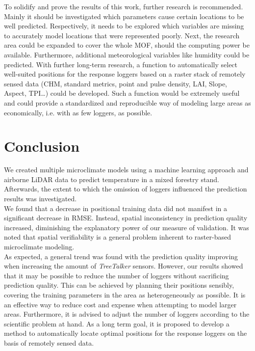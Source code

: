 \documentclass[5p]{elsarticle} %
\begin{document}
To solidify and prove the results of this work, further research is recommended. Mainly it should be investigated which parameters cause certain locations to be well predicted. Respectively, it needs to be explored which variables are missing to accurately model locations that were represented poorly. Next, the research area could be expanded to cover the whole MOF, should the computing power be available. Furthermore, additional meteorological variables like humidity could be predicted. With further long-term research, a function to automatically select well-suited positions for the response loggers based on a raster stack of remotely sensed data (CHM, standard metrics, point and pulse density, LAI, Slope, Aspect, TPI…) could be developed. Such a function would be extremely useful and could provide a standardized and reproducible way of modeling large areas as economically, i.e. with as few loggers, as possible.



\hypertarget{conclusion}{%
\section{Conclusion}\label{conclusion}}

We created multiple microclimate models using a machine learning approach and airborne LiDAR data to predict temperature in a mixed forestry stand. Afterwards, the extent to which the omission of loggers influenced the prediction results was investigated.\\
We found that a decrease in positional training data did not manifest in a significant decrease in RMSE. Instead, spatial inconsistency in prediction quality increased, diminishing the explanatory power of our measure of validation. It was noted that spatial verifiability is a general problem inherent to raster-based microclimate modeling.\\ 
As expected, a general trend was found with the prediction quality improving when increasing the amount of \emph{TreeTalker} sensors. However, our results showed that it may be possible to reduce the number of loggers without sacrificing prediction quality. This can be achieved by planning their positions sensibly, covering the training parameters in the area as heterogeneously as possible. It is an effective way to reduce cost and expense when attempting to model larger areas. Furthermore, it is advised to adjust the number of loggers according to the scientific problem at hand. As a long term goal, it is proposed to develop a method to automatically locate optimal positions for the response loggers on the basis of remotely sensed data.
\end{document}
